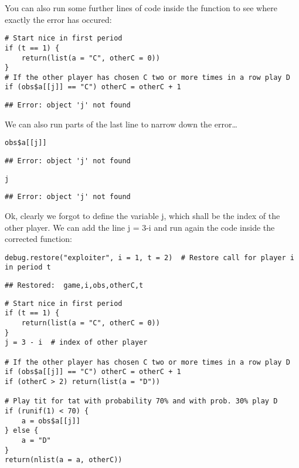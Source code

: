 \documentclass[]{article}
\begin{document}
You can also run some further lines of code inside the function to see
where exactly the error has occured:

\begin{verbatim}
# Start nice in first period
if (t == 1) {
    return(list(a = "C", otherC = 0))
}
# If the other player has chosen C two or more times in a row play D
if (obs$a[[j]] == "C") otherC = otherC + 1
\end{verbatim}

\begin{verbatim}
## Error: object 'j' not found
\end{verbatim}

We can also run parts of the last line to narrow down the error\ldots{}

\begin{verbatim}
obs$a[[j]]
\end{verbatim}

\begin{verbatim}
## Error: object 'j' not found
\end{verbatim}

\begin{verbatim}
j
\end{verbatim}

\begin{verbatim}
## Error: object 'j' not found
\end{verbatim}

Ok, clearly we forgot to define the variable j, which shall be the index
of the other player. We can add the line j = 3-i and run again the code
inside the corrected function:

\begin{verbatim}
debug.restore("exploiter", i = 1, t = 2)  # Restore call for player i in period t
\end{verbatim}

\begin{verbatim}
## Restored:  game,i,obs,otherC,t
\end{verbatim}

\begin{verbatim}
# Start nice in first period
if (t == 1) {
    return(list(a = "C", otherC = 0))
}
j = 3 - i  # index of other player

# If the other player has chosen C two or more times in a row play D
if (obs$a[[j]] == "C") otherC = otherC + 1
if (otherC > 2) return(list(a = "D"))

# Play tit for tat with probability 70% and with prob. 30% play D
if (runif(1) < 70) {
    a = obs$a[[j]]
} else {
    a = "D"
}
return(nlist(a = a, otherC))
\end{verbatim}
\end{document}
